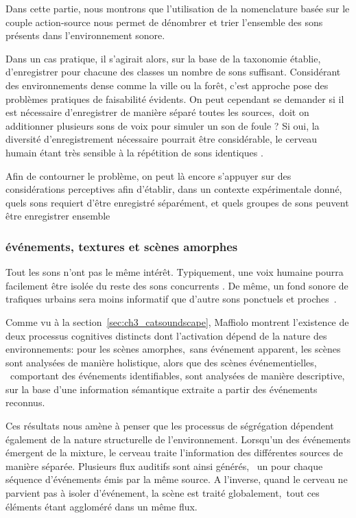 Dans cette partie, nous montrons que  l'utilisation de la nomenclature basée sur le couple action-source nous permet de dénombrer et trier l'ensemble des sons présents dans l'environnement sonore.

Dans un cas pratique, il s'agirait alors, sur la base de la taxonomie établie, d'enregistrer pour chacune des classes  un nombre de sons suffisant. Considérant des environnements dense comme la ville ou la forêt, c'est approche pose des problèmes pratiques de faisabilité évidents. On peut cependant se demander si il est nécessaire d'enregistrer de manière séparé toutes les sources,\eg~doit on additionner plusieurs sons de voix pour simuler un son de foule ? Si oui, la diversité d'enregistrement nécessaire pourrait être considérable, le cerveau humain étant très sensible à la répétition de sons identiques \citep{agus2010rapid}.

Afin de contourner le problème, on peut là encore s’appuyer sur des considérations perceptives afin d'établir, dans un contexte expérimentale donné, quels sons requiert d'être enregistré séparément, et quels groupes de sons peuvent être enregistrer ensemble

\subsubsection{événements, textures et scènes amorphes}

Tout les sons n'ont pas le même intérêt. Typiquement, une voix humaine pourra facilement être isolée du reste des sons concurrents \citep{carlyon2004brain}. De même, un fond sonore de trafiques urbains sera moins informatif que d'autre sons ponctuels et proches~\citep{southworth1969sonic}.

Comme vu à la section~\ref{sec:ch3_catsoundscape}, Maffiolo montrent l'existence de deux processus cognitives distincts dont l'activation dépend de la nature des environnements: pour les scènes amorphes,\ie~sans événement apparent, les scènes sont analysées de manière holistique, alors que des scènes événementielles, \ie~comportant des événements identifiables, sont analysées de manière descriptive, sur la base d'une information sémantique extraite a partir des événements reconnus.

Ces résultats nous amène à penser que les processus de ségrégation dépendent également de la nature structurelle de l'environnement. Lorsqu'un des événements émergent de la mixture, le cerveau traite l'information des différentes sources de manière séparée. Plusieurs flux auditifs sont ainsi générés, \ie~un pour chaque séquence d'événements émis par la même source. A l'inverse, quand le cerveau ne parvient pas à isoler d'événement, la scène est traité globalement,\ie~tout ces éléments étant aggloméré dans un même flux. 

